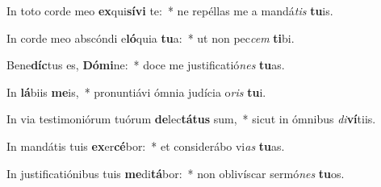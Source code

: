 \item In toto corde meo \textbf{ex}qui\textbf{sí}\textbf{vi} te:~* ne repéllas me a mandá\textit{tis} \textbf{tu}is.
\item In corde meo abscóndi e\textbf{ló}quia \textbf{tu}a:~* ut non pec\textit{cem} \textbf{ti}bi.
\item Bene\textbf{díc}tus es, \textbf{Dó}\textbf{mi}ne:~* doce me justificatió\textit{nes} \textbf{tu}as.
\item In \textbf{lá}biis \textbf{me}is,~* pronuntiávi ómnia judícia o\textit{ris} \textbf{tu}i.
\item In via testimoniórum tuórum \textbf{de}lec\textbf{tá}\textbf{tus} sum,~* sicut in ómnibus \textit{di}\textbf{ví}tiis.
\item In mandátis tuis \textbf{ex}er\textbf{cé}bor:~* et considerábo vi\textit{as} \textbf{tu}as.
\item In justificatiónibus tuis \textbf{me}di\textbf{tá}bor:~* non oblivíscar sermó\textit{nes} \textbf{tu}os.
